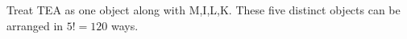 Treat TEA as one object along with M,I,L,K. These five distinct objects can be arranged in $5!=\boxed{120}$ ways.
